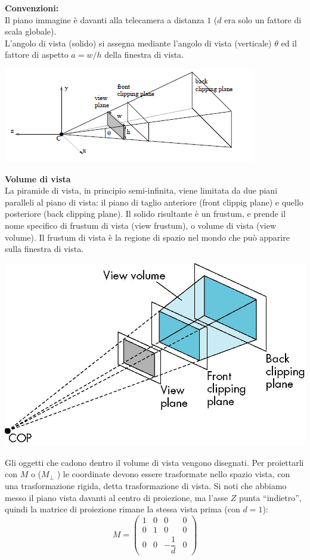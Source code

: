 \documentclass[a4paper, 10pt]{article}
\begin{document}
		\begin{multicols}{2}
			\textbf{Convenzioni:}\\
			Il piano immagine è davanti alla telecamera a distanza $ 1 $ ($ d $ era solo un fattore di scala globale).\\
			L’angolo di vista (solido) si assegna mediante l’angolo di vista (verticale) $ \theta $ ed il fattore di aspetto $ a = w/h $ della finestra di vista.
			
			\columnbreak
			
			\includegraphics[scale=0.5]{pipelineg3}
			
		\end{multicols}
	
		\noindent
		\textbf{Volume di vista}\\
		La piramide di vista, in principio semi-infinita, viene limitata da due piani paralleli al piano di vista: il piano di taglio anteriore (front clippig plane) e quello posteriore (back clipping plane). Il solido risultante è un frustum, e prende il nome specifico di frustum di vista (view frustum), o volume di vista (view volume). Il frustum di vista è la regione di spazio nel mondo che può apparire sulla finestra di vista.
		
		\begin{center}
			\includegraphics[scale=0.15]{pipelineg4}
		\end{center}
		Gli oggetti che cadono dentro il volume di vista vengono disegnati. Per proiettarli con $ M $ o ($ M_{\perp} $ ) le coordinate devono essere trasformate nello spazio vista, con una trasformazione rigida, detta trasformazione di vista. Si noti che abbiamo messo il piano vista davanti al centro di proiezione, ma l’asse $ Z $ punta “indietro”, quindi la matrice di proiezione rimane la stessa vista prima (con $ d = 1 $):
		\[
			M =
			\begin{pmatrix}
				1 & 0 & 0 & 0 \\
				0 & 1 & 0 & 0 \\
				0 & 0 & -\dfrac{1}{d} & 0
			\end{pmatrix}
		\]
	
\end{document}
